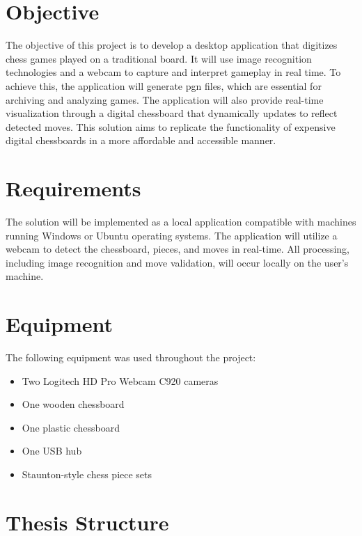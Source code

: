 \section{Objective}

The objective of this project is to develop a desktop application that digitizes chess games played on a traditional board. It will use image recognition technologies and a webcam to capture and interpret gameplay in real time. To achieve this, the application will generate \gls{pgn} files, which are essential for archiving and analyzing games. The application will also provide real-time visualization through a digital chessboard that dynamically updates to reflect detected moves. This solution aims to replicate the functionality of expensive digital chessboards in a more affordable and accessible manner.


\section{Requirements}

The solution will be implemented as a local application compatible with machines running Windows or Ubuntu operating systems. The application will utilize a webcam to detect the chessboard, pieces, and moves in real-time. All processing, including image recognition and move validation, will occur locally on the user's machine.

\section{Equipment}
The following equipment was used throughout the project:

\begin{itemize}
    \item Two Logitech HD Pro Webcam C920 cameras
    \item One wooden chessboard
    \item One plastic chessboard
    \item One USB hub
    \item Staunton-style chess piece sets
\end{itemize}


\section{Thesis Structure}


